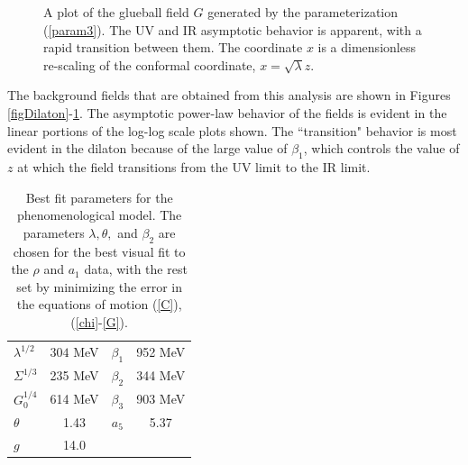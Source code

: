 \documentclass[aps,prd,12pt,nofootinbib]{revtex4}
\begin{document}
\begin{figure}[htb]
\caption{A plot of the glueball field $G$ generated by the parameterization (\ref{param3}).
The UV and IR asymptotic behavior is apparent, with a rapid transition between them.
The coordinate $x$ is a dimensionless re-scaling of the conformal coordinate, $x=\sqrt{\lambda}z$.}
\label{figGlueball}
\end{figure}

The background fields that are obtained from this analysis are shown in Figures \ref{figDilaton}-\ref{figGlueball}. 
The asymptotic power-law behavior of the fields is evident in the linear portions of the log-log scale plots shown.
 The ``transition" behavior is most evident in the dilaton because of the large value of $\beta_1$, which controls the value of $z$ at which the field transitions from the UV limit to the IR limit. 

\begin{table}[htb]
\begin{center}
\begin{tabular}{| l | c || c | c | }
\hline
  $\lambda^{1/2}$ & $304$ MeV & $\beta_1$ & 952 MeV  \\
  $\Sigma^{1/3}$ &  235 MeV & $\beta_2$ & 344 MeV \\
  $G_0^{1/4}$ & 614 MeV & $\beta_3$ & 903 MeV \\
 $ \theta $& 1.43 &  $a_5$ & 5.37 \\
  $g $& 14.0 & & \\
  \hline
\end{tabular}
\caption{Best fit parameters for the phenomenological model. 
The parameters $\lambda, \theta,$ and $ \beta_2$ are chosen for the best visual fit to the $\rho$ and $a_1$ data, with the rest set by minimizing the error in the equations of motion (\ref{C}), (\ref{chi}-\ref{G}). }
\label{tabParam}
\end{center}
\end{table}
\end{document}
